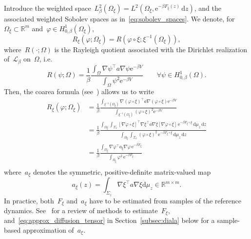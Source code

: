 \documentclass[a4]{article}
\newcommand{\cL}{\mathcal{L}}
\renewcommand{\d}{\mathrm{d}}
\newcommand{\e}{\mathrm{e}}
\newcommand{\R}{\mathbb{R}}
\newcommand{\1}{\mathbbm 1}
\newcommand{\dsint}{\displaystyle\int}
\begin{document}
    Introduce the weighted space~$L_{\beta}^2(\Omega_\xi) = L^2(\Omega_\xi,\e^{-\beta F_\xi(z)}\,\d z)$, and the associated weighted Sobolev spaces as in~\eqref{eq:sobolev_spaces}. We denote, for~$\Omega_\xi\subset\R^m$ and~$\varphi\in H_{0,\beta}^1(\Omega_\xi)$,
    \begin{equation}
        R_\xi\left(\varphi;\Omega_\xi\right) = R\left(\varphi\circ\xi;\xi^{-1}(\Omega_\xi)\right),
    \end{equation}
    where~$R(\cdot;\Omega)$ is the Rayleigh quotient associated with the Dirichlet realization of~$\cL_\beta$ on~$\Omega$, i.e.
    \begin{equation}
        R(\psi;\Omega) = \frac1\beta\frac{\dsint_{\Omega}\nabla\psi^\top a \nabla\psi\e^{-\beta V}}{\dsint_{\Omega}\psi^2\e^{-\beta V}}\qquad\forall\psi\in H_{0,\beta}^1(\Omega).
    \end{equation}
    Then, the coarea formula (see~\cite[Corollary 5.2.6]{KP08}) allows us to write
    \begin{equation}
        \label{eq:coarea_computation}
        \begin{aligned}
            R_\xi\left(\varphi;\Omega_\xi\right) &= \frac1\beta\frac{\dsint_{\xi^{-1}(\Omega_\xi)}\nabla(\varphi\circ\xi)^\top a\nabla(\varphi\circ\xi)\e^{-\beta V}}{\dsint_{\xi^{-1}(\Omega_\xi)}(\varphi\circ\xi)^2\e^{-\beta V}}\\
            &=\frac1\beta\frac{\dsint_{\Omega_\xi}\dsint_{\Sigma_z}{\left[\nabla\varphi\circ\xi\right]^\top\nabla\xi^\top a\nabla\xi\left[\nabla\varphi\circ\xi\right]}\,\e^{-\beta F_\xi\circ\xi}\,\d\mu_z\,\d z}{\dsint_{\Omega_\xi}\dsint_{\Sigma_z}(\varphi\circ \xi)^2\,\e^{-\beta F_\xi\circ \xi}\,\d\mu_z\,\d z}\\
            &=\frac1\beta\frac{\dsint_{\Omega_\xi}\nabla\varphi^\top a_\xi \nabla \varphi\,\e^{-\beta F_\xi}}{\dsint_{\Omega_\xi}\varphi^2\,\e^{-\beta F_\xi}}\\
        \end{aligned}
    \end{equation}
    where~$a_\xi$ denotes the symmetric, positive-definite matrix-valued map
    \begin{equation}
        \label{eq:diffusion_tensor}
        a_\xi(z) = \dsint_{\Sigma_z}{\nabla\xi^\top a\nabla\xi}\d\mu_z \in \R^{m\times m}.
    \end{equation}
    In practice, both~$F_\xi$ and~$a_\xi$ have to be estimated from samples of the reference dynamics. See~\cite{LRS10} for a review of methods to estimate~$F_\xi$, and~\eqref{eq:approx_diffusion_tensor} in Section~\ref{subsec:diala} below for a sample-based approximation of~$a_\xi$.
\end{document}
